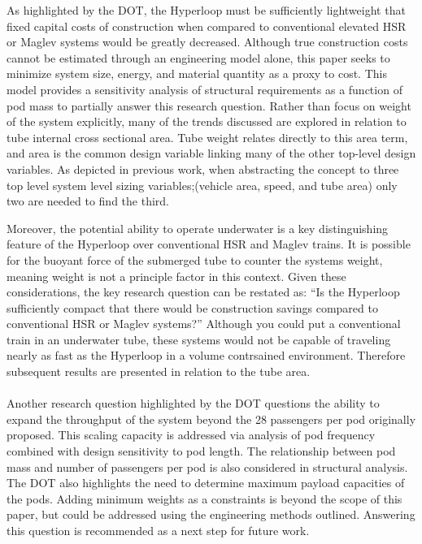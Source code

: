 	As highlighted by the DOT, the Hyperloop must be sufficiently lightweight
	that fixed capital costs of construction when compared to conventional
	elevated HSR or Maglev systems would be greatly decreased.
	Although true construction costs cannot be estimated through an engineering
	model alone, this paper seeks to minimize system size, energy, and material
	quantity as a proxy to cost. This model provides a sensitivity
	analysis of structural requirements as a function of pod mass to partially
	answer this research question. Rather than focus on weight of the system explicitly,
	many of the trends discussed are explored in relation to tube internal
	cross sectional area. Tube weight relates directly to this area term, and
	area is the common design variable linking many of the other top-level
	design variables. As depicted in previous work,
	\cite{Chin} when abstracting the concept to three top level system level
	sizing variables;(vehicle area, speed, and tube area) only two are needed
	to find the third.

	Moreover, the potential ability to operate underwater is a key distinguishing feature
	of the Hyperloop over conventional HSR and Maglev trains. It is possible for the buoyant force
	of the submerged tube to counter the systems weight, meaning weight is not
	a principle factor in this context.
	Given these considerations, the key research
	question can be restated as: ``Is the Hyperloop sufficiently compact that
	there would be construction savings compared to conventional
	HSR or Maglev systems?'' Although you could put a conventional train in an
	underwater tube, these systems would not be capable of traveling nearly as
	fast as the Hyperloop in a volume contrsained environment.
	Therefore subsequent results are presented in relation to the tube area.\\
	\\
	Another research question highlighted by the DOT questions the ability to
	expand the throughput of the system beyond the 28 passengers per pod
	originally proposed. This scaling capacity is addressed
	via analysis of pod frequency combined with design sensitivity to pod length.
	The relationship between pod mass and number of passengers per pod is also
	considered in structural analysis.\\

	The DOT also highlights the need to determine maximum payload capacities
	of the pods. Adding minimum weights as a constraints is beyond the scope of
	this paper, but could be addressed using the engineering methods outlined.
	Answering this question is recommended as a next step for future work.\\

